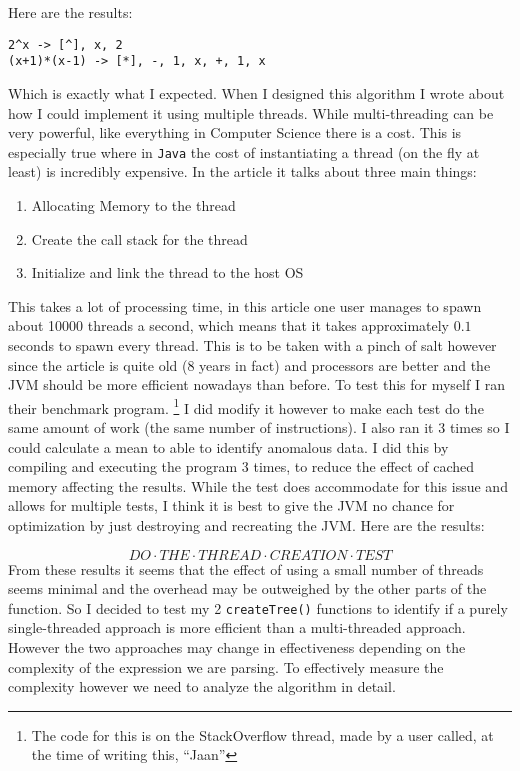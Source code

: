 \documentclass[../../../../../main.tex]{subfiles}
\begin{document}
Here are the results:
\begin{verbatim}
2^x -> [^], x, 2
(x+1)*(x-1) -> [*], -, 1, x, +, 1, x
\end{verbatim}
Which is exactly what I expected.
\newpage \noindent
When I designed this algorithm I wrote about how I could implement it using multiple threads. While multi-threading can be very powerful, like everything in Computer Science there is a cost. This is especially true where in \texttt{Java} the cost of instantiating a thread\cite{threadCreationJava} (on the fly at least) is incredibly expensive. In the article it talks about three main things:
\begin{enumerate}
\item Allocating Memory to the thread
\item Create the call stack for the thread\cite{threadStackJava, callStack}
\item Initialize and link the thread to the host OS
\end{enumerate}
This takes a lot of processing time, in this article\cite{threadCreationRate} one user manages to spawn about 10000 threads a second, which means that it takes approximately $0.1$ seconds to spawn every thread. This is to be taken with a pinch of salt however since the article is quite old (8 years in fact) and processors are better and the JVM should be more efficient nowadays than before. To test this for myself I ran their benchmark program.
\footnote{The code for this is on the StackOverflow thread, made by a user called, at the time of writing this, ``Jaan''\cite{threadCreationRate}} 
I did modify it however to make each test do the same amount of work (the same number of instructions). I also ran it 3 times so I could calculate a mean to able to identify anomalous data. I did this by compiling and executing the program 3 times, to reduce the effect of cached memory affecting the results. While the test does accommodate for this issue and allows for multiple tests, I think it is best to give the JVM no chance for optimization by just destroying and recreating the JVM. Here are the results:

\[DO \cdot THE \cdot THREAD \cdot CREATION \cdot TEST\]
\newpage\noindent
From these results it seems that the effect of using a small number of threads seems minimal and the overhead may be outweighed by the other parts of the function. So I decided to test my 2 \texttt{createTree()} functions to identify if a purely single-threaded approach is more efficient than a multi-threaded approach. However the two approaches may change in effectiveness depending on the complexity of the expression we are parsing. To effectively measure the complexity however we need to analyze the algorithm in detail.
\end{document}
